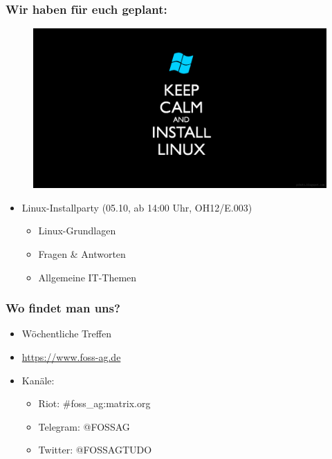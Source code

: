 \begin{frame}
	\frametitle{Wir haben für euch geplant:}
	\begin{figure}
		\includegraphics[scale=0.145]{resources/linuxcalm.png}
	\end{figure}
	\begin{itemize}
		\item Linux-Installparty (05.10, ab 14:00 Uhr, OH12/E.003)
		\begin{itemize}
			\item Linux-Grundlagen
			\item Fragen \& Antworten
			\item Allgemeine IT-Themen
		\end{itemize}
	\end{itemize}
\end{frame}

\begin{frame}
	\frametitle{Wo findet man uns?}
	\begin{itemize}
		\item Wöchentliche Treffen
		\item \url{https://www.foss-ag.de}
		\item Kanäle:
		\begin{itemize}
			\item Riot: \#foss\_ag:matrix.org
			\item Telegram: @FOSSAG
			\item Twitter: @FOSSAGTUDO
		\end{itemize}
	\end{itemize}
\end{frame}
